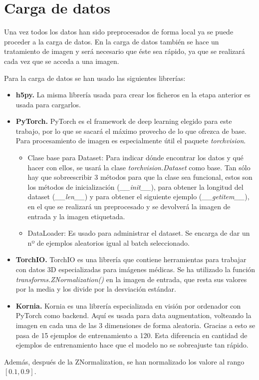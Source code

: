 \section{Carga de datos}\label{sec:data_loading_processing}

Una vez todos los datos han sido preprocesados de forma local ya se puede proceder a la carga de datos. En la carga de datos también se hace un tratamiento de imagen y será necesario que éste sea rápido, ya que se realizará cada vez que se acceda a una imagen.

Para la carga de datos se han usado las siguientes librerías:
\begin{itemize}
\item \textbf{h5py.} La misma librería usada para crear los ficheros en la etapa anterior es usada para cargarlos.
\item \textbf{PyTorch.} PyTorch es el framework de deep learning elegido para este trabajo, por lo que se sacará el máximo provecho de lo que ofrezca de base. Para procesamiento de imagen es especialmente útil el paquete \textit{torchvision}.
\begin{itemize}
\item Clase base para Dataset: Para indicar dónde encontrar los datos y qué hacer con ellos, se usará la clase \textit{torchvision.Dataset} como base. Tan sólo hay que sobreescribir 3 métodos para que la clase sea funcional, estos son los métodos de inicialización (\textit{\_\_init\_\_}), para obtener la longitud del dataset (\textit{\_\_len\_\_}) y para obtener el siguiente ejemplo (\textit{\_\_getitem\_\_}), en el que se realizará un preprocesado y se devolverá la imagen de entrada y la imagen etiquetada.
\item DataLoader: Es usado para administrar el dataset. Se encarga de dar un nº de ejemplos aleatorios igual al batch seleccionado.
\end{itemize}

\item \textbf{TorchIO.} TorchIO \cite{PerezGarcia2020} es una librería que contiene herramientas para trabajar con datos 3D especializadas para imágenes médicas. Se ha utilizado la función \textit{transforms.ZNormalization()} en la imagen de entrada, que resta sus valores por la media y los divide por la desviación estándar.
\item \textbf{Kornia.} Kornia \cite{ERiba2020} es una librería especializada en visión por ordenador con PyTorch como backend. Aquí es usada para data augmentation, volteando la imagen en cada una de las 3 dimensiones de forma aleatoria. Gracias a esto se pasa de 15 ejemplos de entrenamiento a 120. Esta diferencia en cantidad de ejemplos de entrenamiento hace que el modelo no se sobreajuste tan rápido.

\end{itemize}
Además, después de la ZNormalization, se han normalizado los valore al rango $[0.1, 0.9]$.  

